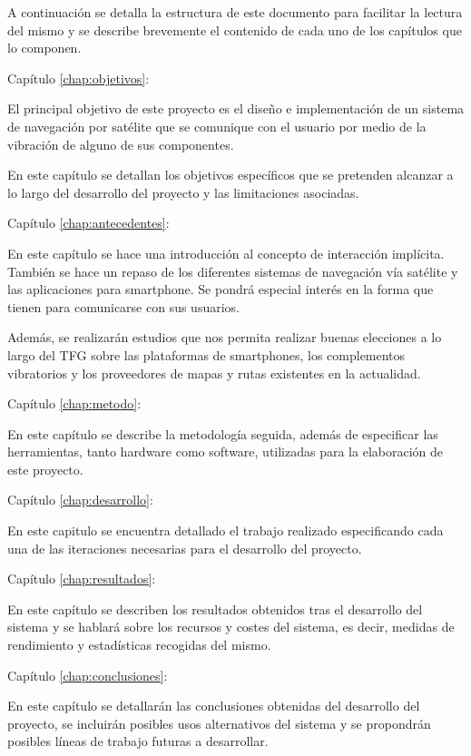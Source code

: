 A continuación se detalla la estructura de este documento para facilitar la lectura del mismo y
se describe brevemente el contenido de cada uno de los capítulos que lo componen.

\begin{definitionlist}
  \item[Capítulo \ref{chap:objetivos}: \nameref{chap:objetivos}] 

  El principal objetivo de este proyecto es el diseño e implementación de un sistema de navegación
  por satélite que se comunique con el usuario por medio de la vibración de alguno de sus
  componentes.

  En este capítulo se detallan los objetivos específicos que se pretenden alcanzar a lo largo del
  desarrollo del proyecto y las limitaciones asociadas.

  \item[Capítulo \ref{chap:antecedentes}: \nameref{chap:antecedentes}]

  En este capítulo se hace una introducción al concepto de interacción implícita. También se hace un
  repaso de los diferentes sistemas de navegación vía satélite y las aplicaciones para
  smartphone. Se pondrá especial interés en la forma que tienen para comunicarse con sus usuarios.

  Además, se realizarán estudios que nos permita realizar buenas elecciones a lo largo del \acs{TFG}
  sobre las plataformas de smartphones, los complementos vibratorios y los proveedores de mapas y
  rutas existentes en la actualidad.

  \item[Capítulo \ref{chap:metodo}: \nameref{chap:metodo}]

  En este capítulo se describe la metodología seguida, además de especificar las herramientas,
  tanto hardware como software, utilizadas para la elaboración de este proyecto.

  \item[Capítulo \ref{chap:desarrollo}: \nameref{chap:desarrollo}]

  En este capitulo se encuentra detallado el trabajo realizado especificando cada una de las
  iteraciones necesarias para el desarrollo del proyecto.

  \item[Capítulo \ref{chap:resultados}: \nameref{chap:resultados}]

  En este capítulo se describen los resultados obtenidos tras el desarrollo del sistema y se hablará
  sobre los recursos y costes del sistema, es decir, medidas de rendimiento y estadísticas recogidas
  del mismo.

  \item[Capítulo \ref{chap:conclusiones}: \nameref{chap:conclusiones}]

  En este capítulo se detallarán las conclusiones obtenidas del desarrollo del proyecto, se
  incluirán posibles usos alternativos del sistema y se propondrán posibles líneas de trabajo
  futuras a desarrollar.

\end{definitionlist}

